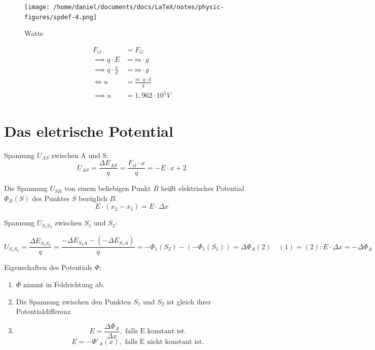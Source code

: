 \documentclass{report}
\begin{document}
\begin{figure}
  \begin{center}
    \texttt{[image: /home/daniel/documents/docs/LaTeX/notes/physic-figures/spdef-4.png]}
  \end{center}
  \caption{Watte}
  \label{fig:watte1}
\end{figure}



\begin{align*}
  F_{el}&=F_G\\
  \implies q\cdot E&=m\cdot g\\
  \implies q\cdot \frac{u}{d} &= m\cdot g\\
  \Leftrightarrow u&=\frac{m\cdot g \cdot d}{q}\\
  \implies u&=1,962\cdot 10^5V
\end{align*}



\section{Das eletrische Potential}


Spannung $U_{AS}$ zwischen A und S:\\
\[U_{AS}=\frac{\Delta E_{AS}}{q}=\frac{F_{el}\cdot x}{q}=-E\cdot x +2\]


\begin{tcolorbox}[colback=yellow!10!white,colframe=yellow!80!black]

Die Spannung $U_{SB}$ von einem beliebigen Punkt $B$ heißt elektrisches
Potential $\Phi_B(S)$ des Punktes $S$ bezüglich $B$.
\[E \cdot (x_2 - x_1) = E\cdot \Delta x \]

Spannung $U_{S_1S_2}$ zwischen $S_1$ und $S_2$:

\[U_{S_1S_2}= \frac{\Delta E_{S_1S_2}}{q}=\frac{-\Delta E_{S_2A}-(-\Delta
E_{S_1A})}{q}=-\Phi_1(S_2)-(-\Phi_1(S_1))=\Delta\Phi_A(2) \quad (1)=(2):E \cdot
\Delta x=-\Delta\Phi_A\]

Eigenschaften des Potentials $\Phi$:
  \begin{enumerate}
    \item $\Phi$ nimmt in Feldrichtung ab.
    \item Die Spannung zwischen den Punkten $S_1$ und $S_2$ ist gleich ihrer Potentialdifferenz.
    \item \[E=\frac{\Delta\Phi_A}{\Delta x}, \text{ falls E konstant ist.}\]
    \[E=-\Phi'_A(x), \text{ falls E nicht konstant ist.}\]
  \end{enumerate}
\end{tcolorbox}
\end{document}
